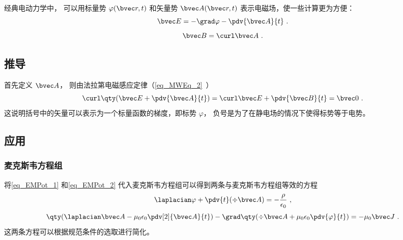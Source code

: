 
\begin{issues}
\issueDraft
\end{issues}


经典电动力学中， 可以用标量势 $\varphi(\bvec r, t)$ 和矢量势 $\bvec A(\bvec r, t)$ 表示电磁场，使一些计算更为方便：
\begin{equation}\label{eq_EMPot_1}
\bvec E = -\grad \varphi - \pdv{\bvec A}{t}~.
\end{equation}
\begin{equation}\label{eq_EMPot_2}
\bvec B = \curl \bvec A~.
\end{equation}

\subsection{推导}
首先定义 $\bvec A$， 则由法拉第电磁感应定律（\autoref{eq_MWEq_2}~）
\begin{equation}
\curl \qty(\bvec E + \pdv{\bvec A}{t}) = \curl \bvec E + \pdv{\bvec B}{t} = \bvec 0~.
\end{equation}
这说明括号中的矢量可以表示为一个标量函数的梯度，即标势 $\varphi$， 负号是为了在静电场的情况下使得标势等于电势。
\subsection{应用}
\subsubsection{麦克斯韦方程组}
将\autoref{eq_EMPot_1} 和\autoref{eq_EMPot_2} 代入麦克斯韦方程组可以得到两条与麦克斯韦方程组等效的方程
\begin{equation}\label{eq_EMPot_4}
\laplacian \varphi + \pdv{t} (\div \bvec A) = -\frac{\rho}{\epsilon_0}~,
\end{equation}
\begin{equation}\label{eq_EMPot_5}
\qty(\laplacian \bvec A - \mu_0\epsilon_0 \pdv[2]{\bvec A}{t}) - \grad \qty(\div \bvec A + \mu_0\epsilon_0 \pdv{\varphi}{t}) = -\mu_0\bvec J~.
\end{equation}
这两条方程可以根据规范条件的选取进行简化。
